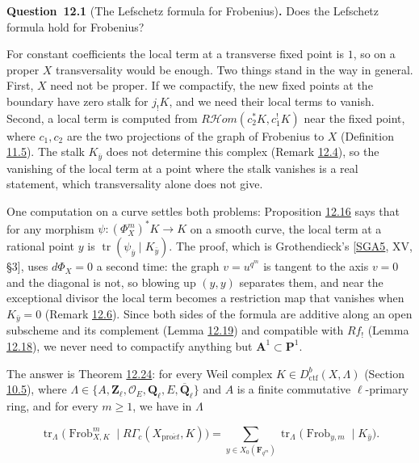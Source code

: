 \documentclass[11pt]{article}
\newenvironment{bpstatement}[2]{\par\addvspace{0.6\baselineskip}\noindent\textbf{#1}#2\textbf{.}\enspace\ignorespaces}
  {\par\addvspace{0.4\baselineskip}}
\providecommand{\cHom}{}\renewcommand{\cHom}{R\mathcal{H}\!om}
\begin{document}
\label{bp228}%
\begin{bpstatement}{Question~12.1}{ (The Lefschetz formula for Frobenius)}
Does the Lefschetz formula hold for Frobenius?
\end{bpstatement}

\label{bp229}%
For constant coefficients the local term at a transverse fixed point is \(1\), so on a proper \(X\) transversality would be enough. Two things stand in the way in general. First, \(X\) need not be proper. If we compactify, the new fixed points at the boundary have zero stalk for \(j_!K\), and we need their local terms to vanish. Second, a local term is computed from \(\cHom(c_2^*K,c_1^!K)\) near the fixed point, where \(c_1,c_2\) are the two projections of the graph of Frobenius to \(X\) (Definition \hyperref[bp184]{11.5}). The stalk \(K_{\bar y}\) does not determine this complex (Remark \hyperref[bp239]{12.4}), so the vanishing of the local term at a point where the stalk vanishes is a real statement, which transversality alone does not give.

One computation on a curve settles both problems: Proposition \hyperref[bp274]{12.16} says that for any morphism \(\psi:(\Phi_X^m)^*K\to K\) on a smooth curve, the local term at a rational point \(y\) is \(\operatorname{tr}(\psi_{\bar y}\mid K_{\bar y})\). The proof, which is Grothendieck's [\hyperref[bp332]{SGA5}, XV, §3], uses \(d\Phi_X=0\) a second time: the graph \(v=u^{q^m}\) is tangent to the axis \(v=0\) and the diagonal is not, so blowing up \((y,y)\) separates them, and near the exceptional divisor the local term becomes a restriction map that vanishes when \(K_{\bar y}=0\) (Remark \hyperref[bp243]{12.6}). Since both sides of the formula are additive along an open subscheme and its complement (Lemma \hyperref[bp283]{12.19}) and compatible with \(Rf_!\) (Lemma \hyperref[bp280]{12.18}), we never need to compactify anything but \(\mathbf A^1\subset\mathbf P^1\).

The answer is Theorem \hyperref[bp298]{12.24}: for every Weil complex \(K\in D^b_{\mathrm{ctf}}(X,\Lambda)\) (Section \hyperref[bp154]{10.5}), where \(\Lambda\in\{A,\mathbf Z_\ell,\mathcal O_E,\mathbf Q_\ell,E,\overline{\mathbf Q}_\ell\}\) and \(A\) is a finite commutative \(\ell\)-primary ring, and for every \(m\geq1\), we have in \(\Lambda\)

\[
\operatorname{tr}_\Lambda\bigl(\operatorname{Frob}_{X,K}^m\mid
R\Gamma_c(X_{\mathrm{pro}\acute{e}t},K)\bigr)
=\sum_{y\in X_0(\mathbf F_{q^m})}
\operatorname{tr}_\Lambda\bigl(\operatorname{Frob}_{y,m}\mid
K_{\bar y}\bigr).
\]
\end{document}
